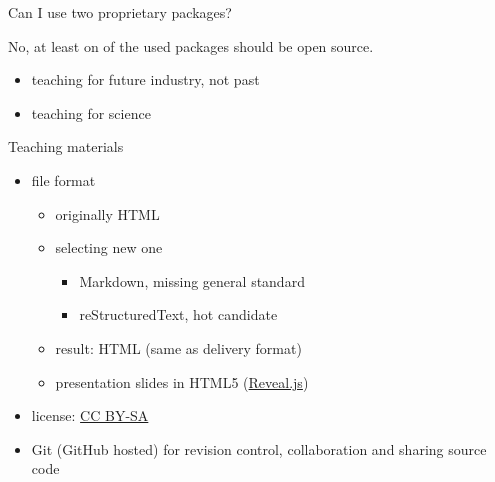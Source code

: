 \documentclass[xcolor={dvipsnames,usenames},beamer]{beamer}
\begin{document}
\begin{frame}{Can I use two proprietary packages?}

No, at least on of the used packages should be open source.

\begin{itemize}
 \item teaching for future industry, not past
 \item teaching for science
\end{itemize}


\end{frame}



\begin{frame}{Teaching materials}

\begin{itemize}
 \item file format
 \begin{itemize}
  \item originally HTML
  \item selecting new one
  \begin{itemize}
   \item Markdown, missing general standard
   \item reStructuredText, hot candidate
  \end{itemize}
  \item result: HTML (same as delivery format)
  \item presentation slides in HTML5 (\href{http://lab.hakim.se/reveal-js}{Reveal.js})
 \end{itemize}
 \item license: \href{https://creativecommons.org/licenses/by-sa/4.0/}{CC BY-SA}
 \item Git (GitHub hosted)
  {\scriptsize for revision control, collaboration and sharing source code}
\end{itemize}


\end{frame}
\end{document}

